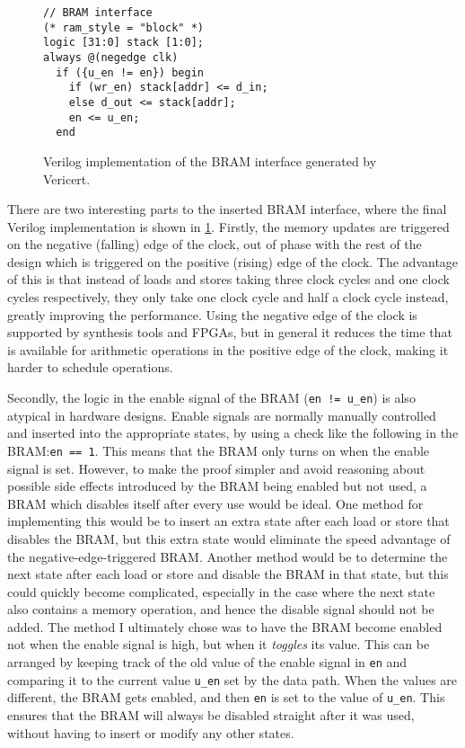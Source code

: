 \begin{figure}
  \centering
  \begin{minipage}{6cm}
\begin{verbatim}
// BRAM interface
(* ram_style = "block" *)
logic [31:0] stack [1:0];
always @(negedge clk)
  if ({u_en != en}) begin
    if (wr_en) stack[addr] <= d_in;
    else d_out <= stack[addr];
    en <= u_en;
  end
\end{verbatim}
  \end{minipage}
  \caption{Verilog implementation of the BRAM interface generated by Vericert.}
  \label{fig:hg:bram-interface}
\end{figure}

There are two interesting parts to the inserted \gls{BRAM} interface, where the
final Verilog implementation is shown in \cref{fig:hg:bram-interface}.  Firstly,
the memory updates are triggered on the negative (falling) edge of the clock,
out of phase with the rest of the design which is triggered on the positive
(rising) edge of the clock.  The advantage of this is that instead of loads and
stores taking three clock cycles and one clock cycles respectively, they only
take one clock cycle and half a clock cycle instead, greatly improving the
performance.  Using the negative edge of the clock is supported by synthesis
tools and FPGAs, but in general it reduces the time that is available for
arithmetic operations in the positive edge of the clock, making it harder to
schedule operations.

Secondly, the logic in the enable signal of the \gls{BRAM} (\texttt{en !=
  u\_en}) is also atypical in hardware designs.  Enable signals are normally
manually controlled and inserted into the appropriate states, by using a check
like the following in the \gls{BRAM}:\@ \texttt{en == 1}.  This means that the
\gls{BRAM} only turns on when the enable signal is set.  However, to make the
proof simpler and avoid reasoning about possible side effects introduced by the
\gls{BRAM} being enabled but not used, a \gls{BRAM} which disables itself after
every use would be ideal.  One method for implementing this would be to insert
an extra state after each load or store that disables the \gls{BRAM}, but this
extra state would eliminate the speed advantage of the negative-edge-triggered
\gls{BRAM}. Another method would be to determine the next state after each load
or store and disable the \gls{BRAM} in that state, but this could quickly become
complicated, especially in the case where the next state also contains a memory
operation, and hence the disable signal should not be added. The method I
ultimately chose was to have the \gls{BRAM} become enabled not when the enable
signal is high, but when it \emph{toggles} its value.  This can be arranged by
keeping track of the old value of the enable signal in \texttt{en} and comparing
it to the current value \texttt{u\_en} set by the data path.  When the values
are different, the \gls{BRAM} gets enabled, and then \texttt{en} is set to the
value of \texttt{u\_en}. This ensures that the \gls{BRAM} will always be
disabled straight after it was used, without having to insert or modify any
other states.

